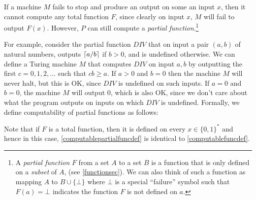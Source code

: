 If a machine \(M\) fails to stop and produce an output on some an input
\(x\), then it cannot compute any total function \(F\), since clearly on
input \(x\), \(M\) will fail to output \(F(x)\). However, \(P\) can
still compute a \emph{partial function}.\footnote{A \emph{partial
  function} \(F\) from a set \(A\) to a set \(B\) is a function that is
  only defined on a \emph{subset} of \(A\), (see \cref{functionsec}). We
  can also think of such a function as mapping \(A\) to
  \(B \cup \{ \bot \}\) where \(\bot\) is a special ``failure'' symbol
  such that \(F(a)=\bot\) indicates the function \(F\) is not defined on
  \(a\).}

For example, consider the partial function \(\ensuremath{\mathit{DIV}}\)
that on input a pair \((a,b)\) of natural numbers, outputs
\(\lceil a/b \rceil\) if \(b > 0\), and is undefined otherwise. We can define a
Turing machine \(M\) that computes \(\ensuremath{\mathit{DIV}}\) on
input \(a,b\) by outputting the first \(c=0,1,2,\ldots\) such that
\(cb \geq a\). If \(a>0\) and \(b=0\) then the machine \(M\) will never
halt, but this is OK, since \(\ensuremath{\mathit{DIV}}\) is undefined
on such inputs. If \(a=0\) and \(b=0\), the machine \(M\) will output
\(0\), which is also OK, since we don't care about what the program
outputs on inputs on which \(\ensuremath{\mathit{DIV}}\) is undefined.
Formally, we define computability of partial functions as follows:

\hypertarget{computablepartialfuncdef}{}

Note that if \(F\) is a total function, then it is defined on every
\(x\in \{0,1\}^*\) and hence in this case,
\cref{computablepartialfuncdef} is identical to
\cref{computablefuncdef}.

